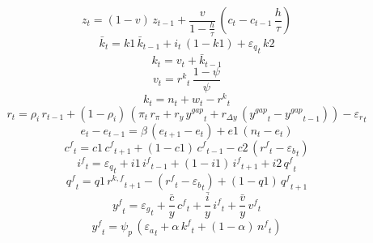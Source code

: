 \begin{dmath}
{{z}}_{t}=\left(1-{{v}}\right)\, {{z}}_{t-1}+\frac{{{v}}}{1-\frac{{{h}}}{{{\tau}}}}\, \left({{c}}_{t}-{{c}}_{t-1}\, \frac{{{h}}}{{{\tau}}}\right)
\end{dmath}
\begin{dmath}
{{\bar{k}}}_{t}={k1}\, {{\bar{k}}}_{t-1}+{{i}}_{t}\, \left(1-{k1}\right)+{{\varepsilon_q}}_{t}\, {k2}
\end{dmath}
\begin{dmath}
{{k}}_{t}={{v}}_{t}+{{\bar{k}}}_{t-1}
\end{dmath}
\begin{dmath}
{{v}}_{t}={{r^{k}}}_{t}\, \frac{1-{{\psi}}}{{{\psi}}}
\end{dmath}
\begin{dmath}
{{k}}_{t}={{n}}_{t}+{{w}}_{t}-{{r^{k}}}_{t}
\end{dmath}
\begin{dmath}
{{r}}_{t}={{\rho_{i}}}\, {{r}}_{t-1}+\left(1-{{\rho_{i}}}\right)\, \left({{\pi}}_{t}\, {{r_{\pi}}}+{{r_{y}}}\, {{y^{gap}}}_{t}+{{r_{\Delta y}}}\, \left({{y^{gap}}}_{t}-{{y^{gap}}}_{t-1}\right)\right)-{{\varepsilon_r}}_{t}
\end{dmath}
\begin{dmath}
{{e}}_{t}-{{e}}_{t-1}={{\beta}}\, \left({{e}}_{t+1}-{{e}}_{t}\right)+{e1}\, \left({{n}}_{t}-{{e}}_{t}\right)
\end{dmath}
\begin{dmath}
{{c^{f}}}_{t}={c1}\, {{c^{f}}}_{t+1}+\left(1-{c1}\right)\, {{c^{f}}}_{t-1}-{c2}\, \left({{r^{f}}}_{t}-{{\varepsilon_b}}_{t}\right)
\end{dmath}
\begin{dmath}
{{i^{f}}}_{t}={{\varepsilon_q}}_{t}+{i1}\, {{i^{f}}}_{t-1}+\left(1-{i1}\right)\, {{i^{f}}}_{t+1}+{i2}\, {{q^{f}}}_{t}
\end{dmath}
\begin{dmath}
{{q^{f}}}_{t}={q1}\, {{r^{k,f}}}_{t+1}-\left({{r^{f}}}_{t}-{{\varepsilon_b}}_{t}\right)+\left(1-{q1}\right)\, {{q^{f}}}_{t+1}
\end{dmath}
\begin{dmath}
{{y^{f}}}_{t}={{\varepsilon_g}}_{t}+{{\frac{\bar{c}}{y}}}\, {{c^{f}}}_{t}+{{\frac{\bar{i}}{y}}}\, {{i^{f}}}_{t}+{{\frac{\bar{v}}{y}}}\, {{v^{f}}}_{t}
\end{dmath}
\begin{dmath}
{{y^{f}}}_{t}={{\psi_p}}\, \left({{\varepsilon_a}}_{t}+{{\alpha}}\, {{k^{f}}}_{t}+\left(1-{{\alpha}}\right)\, {{n^{f}}}_{t}\right)
\end{dmath}
